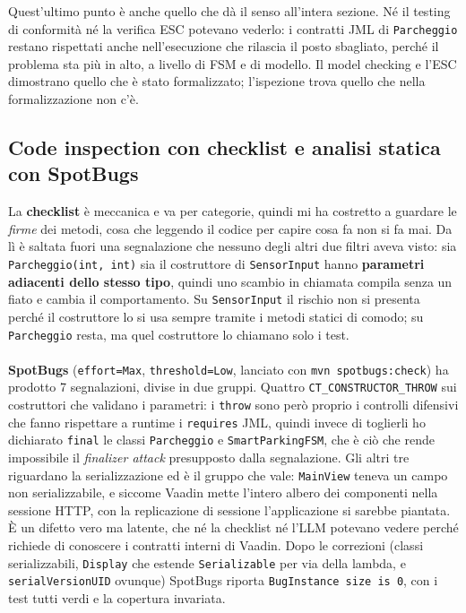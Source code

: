 Quest'ultimo punto è anche quello che dà il senso all'intera sezione. Né il testing di
conformità né la verifica ESC potevano vederlo: i contratti JML di \texttt{Parcheggio}
restano rispettati anche nell'esecuzione che rilascia il posto sbagliato, perché il
problema sta più in alto, a livello di FSM e di modello. Il model checking e l'ESC
dimostrano quello che è stato formalizzato; l'ispezione trova quello che nella
formalizzazione non c'è.

\subsection{Code inspection con checklist e analisi statica con SpotBugs}
\label{sec:spotbugs}
\label{sec:checklist}

La \textbf{checklist} è meccanica e va per categorie, quindi mi ha costretto a guardare
le \emph{firme} dei metodi, cosa che leggendo il codice per capire cosa fa non si fa mai.
Da lì è saltata fuori una segnalazione che nessuno degli altri due filtri aveva visto: sia
\texttt{Parcheggio(int, int)} sia il costruttore di \texttt{SensorInput} hanno
\textbf{parametri adiacenti dello stesso tipo}, quindi uno scambio in chiamata compila
senza un fiato e cambia il comportamento. Su \texttt{SensorInput} il rischio non si
presenta perché il costruttore lo si usa sempre tramite i metodi statici di comodo; su
\texttt{Parcheggio} resta, ma quel costruttore lo chiamano solo i test.
\\ \\
\textbf{SpotBugs} (\texttt{effort=Max}, \texttt{threshold=Low}, lanciato con
\texttt{mvn spotbugs:check}) ha prodotto 7 segnalazioni, divise in due gruppi. Quattro
\texttt{CT\_CONSTRUCTOR\_THROW} sui costruttori che validano i parametri: i \texttt{throw}
sono però proprio i controlli difensivi che fanno rispettare a runtime i \texttt{requires}
JML, quindi invece di toglierli ho dichiarato \texttt{final} le classi
\texttt{Parcheggio} e \texttt{SmartParkingFSM}, che è ciò che rende impossibile il
\emph{finalizer attack} presupposto dalla segnalazione. Gli altri tre riguardano la
serializzazione ed è il gruppo che vale: \texttt{MainView} teneva un campo non
serializzabile, e siccome Vaadin mette l'intero albero dei componenti nella sessione HTTP,
con la replicazione di sessione l'applicazione si sarebbe piantata. È un difetto vero ma
latente, che né la checklist né l'LLM potevano vedere perché richiede di conoscere i
contratti interni di Vaadin. Dopo le correzioni (classi serializzabili,
\texttt{Display} che estende \texttt{Serializable} per via della lambda, e
\texttt{serialVersionUID} ovunque) SpotBugs riporta \texttt{BugInstance size is 0}, con i
test tutti verdi e la copertura invariata.
